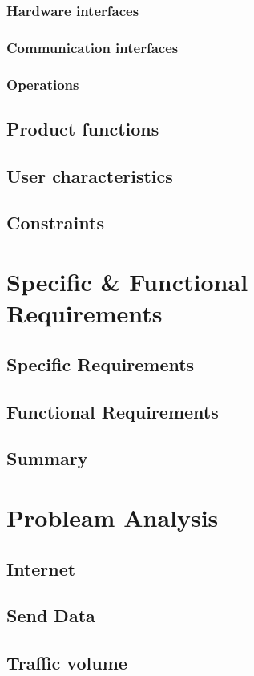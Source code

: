 \documentclass[11pt]{article}
\begin{document}
\subsubsection{Hardware interfaces}
\subsubsection{Communication interfaces}
\subsubsection{Operations}
\subsection{Product functions}
\subsection{User characteristics}
\subsection{Constraints}
\section{Specific \& Functional Requirements}
\subsection{Specific Requirements}
\subsection{Functional Requirements}
\subsection{Summary}
\section{Probleam Analysis}
\subsection{Internet}
\subsection{Send Data}
\subsection{Traffic volume}
\end{document}
